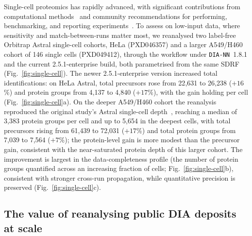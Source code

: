 \documentclass[preprint,12pt]{elsarticle}
\begin{document}
Single-cell proteomics has rapidly advanced, with significant contributions from computational methods~\cite{slavov2025Review} and community recommendations for performing, benchmarking, and reporting experiments~\cite{White_Paper}. To assess \quantmsdiann{} on low-input data, where sensitivity and match-between-runs matter most, we reanalysed two label-free Orbitrap Astral single-cell cohorts, HeLa (PXD046357) and a larger A549/H460 cohort of 146 single cells (PXD049412), through the workflow under \texttt{DIA-NN}~1.8.1 and the current 2.5.1-enterprise build, both parametrised from the same SDRF (Fig.~\ref{fig:single-cell}).
The newer 2.5.1-enterprise version increased total identifications: on HeLa Astral, total precursors rose from 22{,}631 to 26{,}238 ($+16$\%) and protein groups from 4{,}137 to 4{,}840 ($+17$\%), with the gain holding per cell (Fig.~\ref{fig:single-cell}a). On the deeper A549/H460 cohort the reanalysis reproduced the original study's Astral single-cell depth~\cite{bubis2025astral}, reaching a median of 3{,}383 protein groups per cell and up to 5{,}654 in the deepest cells, with total precursors rising from 61{,}439 to 72{,}031 ($+17$\%) and total protein groups from 7{,}039 to 7{,}564 ($+7$\%); the protein-level gain is more modest than the precursor gain, consistent with the near-saturated protein depth of this larger cohort.
The improvement is largest in the data-completeness profile (the number of protein groups quantified across an increasing fraction of cells; Fig.~\ref{fig:single-cell}b), consistent with stronger cross-run propagation, while quantitative precision is preserved (Fig.~\ref{fig:single-cell}c).

\subsection{The value of reanalysing public DIA deposits at scale}
\label{sec:reanalyses}
\end{document}
